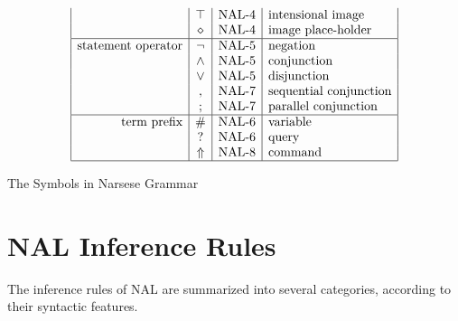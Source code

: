 \begin{table}[hbt]
\[\begin{array}{|r|c|c|l|}
& \top & \mbox{NAL-4} & \mbox{intensional image} \\
& \diamond & \mbox{NAL-4} & \mbox{image place-holder} \\
\hline 
\mbox{statement operator} 
& \neg & \mbox{NAL-5} & \mbox{negation} \\ 
& \wedge  & \mbox{NAL-5} & \mbox{conjunction} \\
& \vee & \mbox{NAL-5} & \mbox{disjunction} \\
& , & \mbox{NAL-7} & \mbox{sequential conjunction} \\
& ; & \mbox{NAL-7} & \mbox{parallel conjunction} \\
\hline
\mbox{term prefix} 
& \# & \mbox{NAL-6} & \mbox{variable} \\
& ? & \mbox{NAL-6} & \mbox{query} \\
& \Uparrow & \mbox{NAL-8} & \mbox{command} \\ 
\hline \end{array} \]
\caption{The Symbols in Narsese Grammar}
\label{Narsese-Symbols}
\end{table}


\section{NAL Inference Rules}

The inference rules of NAL are summarized into several categories, according to their syntactic features.

